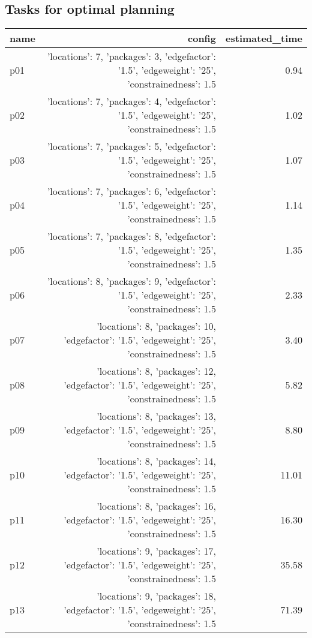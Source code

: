 \documentclass{article}
\begin{document}
                                \subsection*{Tasks for optimal planning}
                                
                            \begin{center}
                            \scriptsize
                            \begin{tabular}{@{}l|r|r@{}}
                            name & config & estimated\_time\\\midrule
                              p01&{'locations': 7, 'packages': 3, 'edgefactor': '1.5', 'edgeweight': '25', 'constrainedness': 1.5}&0.94\\
  p02&{'locations': 7, 'packages': 4, 'edgefactor': '1.5', 'edgeweight': '25', 'constrainedness': 1.5}&1.02\\
  p03&{'locations': 7, 'packages': 5, 'edgefactor': '1.5', 'edgeweight': '25', 'constrainedness': 1.5}&1.07\\
  p04&{'locations': 7, 'packages': 6, 'edgefactor': '1.5', 'edgeweight': '25', 'constrainedness': 1.5}&1.14\\
  p05&{'locations': 7, 'packages': 8, 'edgefactor': '1.5', 'edgeweight': '25', 'constrainedness': 1.5}&1.35\\
  p06&{'locations': 8, 'packages': 9, 'edgefactor': '1.5', 'edgeweight': '25', 'constrainedness': 1.5}&2.33\\
  p07&{'locations': 8, 'packages': 10, 'edgefactor': '1.5', 'edgeweight': '25', 'constrainedness': 1.5}&3.40\\
  p08&{'locations': 8, 'packages': 12, 'edgefactor': '1.5', 'edgeweight': '25', 'constrainedness': 1.5}&5.82\\
  p09&{'locations': 8, 'packages': 13, 'edgefactor': '1.5', 'edgeweight': '25', 'constrainedness': 1.5}&8.80\\
  p10&{'locations': 8, 'packages': 14, 'edgefactor': '1.5', 'edgeweight': '25', 'constrainedness': 1.5}&11.01\\
  p11&{'locations': 8, 'packages': 16, 'edgefactor': '1.5', 'edgeweight': '25', 'constrainedness': 1.5}&16.30\\
  p12&{'locations': 9, 'packages': 17, 'edgefactor': '1.5', 'edgeweight': '25', 'constrainedness': 1.5}&35.58\\
  p13&{'locations': 9, 'packages': 18, 'edgefactor': '1.5', 'edgeweight': '25', 'constrainedness': 1.5}&71.39\\

\end{tabular}
\end{center}
\end{document}
